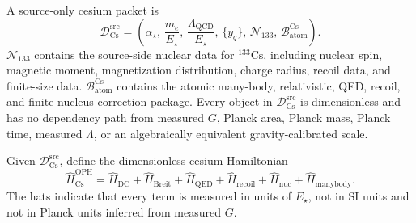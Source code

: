 \begin{definition}\label{def:cs-source-packet}
A source-only cesium packet is
\[
\mathcal D_{\mathrm{Cs}}^{\mathrm{src}}
=
\left(
\alpha_\star,\,
\frac{m_e}{E_\star},\,
\frac{\Lambda_{\mathrm{QCD}}}{E_\star},\,
\{y_q\},\,
\mathcal N_{133},\,
\mathcal B_{\mathrm{atom}}^{\mathrm{Cs}}
\right).
\]
\(\mathcal N_{133}\) contains the source-side nuclear data for \({}^{133}\mathrm{Cs}\), including
nuclear spin, magnetic moment, magnetization distribution, charge radius, recoil data, and
finite-size data. \(\mathcal B_{\mathrm{atom}}^{\mathrm{Cs}}\) contains the atomic many-body,
relativistic, QED, recoil, and finite-nucleus correction package. Every object in
\(\mathcal D_{\mathrm{Cs}}^{\mathrm{src}}\) is dimensionless and has no dependency path from
measured \(G\), Planck area, Planck mass, Planck time, measured \(\Lambda\), or an algebraically
equivalent gravity-calibrated scale.
\end{definition}

\begin{definition}\label{def:oph-cs-hamiltonian}
Given \(\mathcal D_{\mathrm{Cs}}^{\mathrm{src}}\), define the dimensionless cesium Hamiltonian
\[
\widehat H_{\mathrm{Cs}}^{\mathrm{OPH}}
=
\widehat H_{\mathrm{DC}}
+
\widehat H_{\mathrm{Breit}}
+
\widehat H_{\mathrm{QED}}
+
\widehat H_{\mathrm{recoil}}
+
\widehat H_{\mathrm{nuc}}
+
\widehat H_{\mathrm{manybody}}.
\]
The hats indicate that every term is measured in units of \(E_\star\), not in SI units and not in
Planck units inferred from measured \(G\).
\end{definition}

